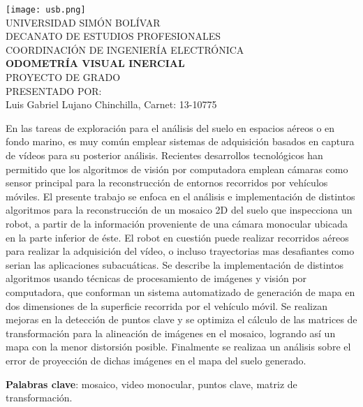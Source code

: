 \begin{titlepage}
    \begin{center}

        \texttt{[image: usb.png]} \\
        \textsc {\large UNIVERSIDAD SIMÓN BOLÍVAR} \\
        \textsc{DECANATO DE ESTUDIOS PROFESIONALES\\
        COORDINACIÓN DE INGENIERÍA ELECTRÓNICA}\\
        \textbf{ODOMETRÍA VISUAL INERCIAL} \\
        PROYECTO DE GRADO \\
        PRESENTADO POR: \\
        Luis Gabriel Lujano Chinchilla, Carnet: 13-10775

    \end{center}
\abstract
{
    En las tareas de exploración para el análisis del suelo en espacios aéreos o en fondo marino, es muy común emplear sistemas de adquisición basados en captura de vídeos para su posterior análisis. Recientes desarrollos tecnológicos han permitido que los algoritmos de visión por computadora emplean cámaras como sensor principal para la reconstrucción de entornos recorridos por vehículos móviles. El presente trabajo se enfoca en el análisis e implementación de distintos algoritmos para la reconstrucción de un mosaico 2D del suelo que inspecciona un robot, a partir de la información proveniente de una cámara monocular ubicada en la parte inferior de éste. El robot en cuestión puede realizar recorridos aéreos para realizar la adquisición del vídeo, o incluso trayectorias mas desafiantes como serian las aplicaciones subacuáticas. Se describe la implementación de distintos algoritmos usando técnicas de procesamiento de imágenes y visión por computadora, que conforman un sistema automatizado de generación de mapa en dos dimensiones de la superficie recorrida por el vehículo móvil. Se realizan mejoras en la detección de puntos clave y se optimiza el cálculo de las matrices de transformación para la alineación de imágenes en el mosaico, logrando así un mapa con la menor distorsión posible. Finalmente se realizaa un análisis sobre el error de proyección de dichas imágenes en el mapa del suelo generado.
    
}

\noindent \begin{small} \textbf{Palabras clave}: mosaico, video monocular, puntos clave, matriz de transformación. 
\end{small}
	
\clearpage
{}

\end{titlepage}
